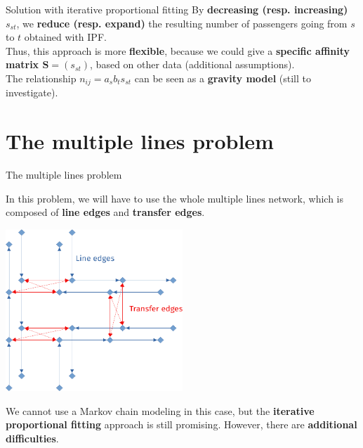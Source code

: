 \documentclass[10pt]{beamer}
\newcommand{\imp}[1]{\textbf{\color{cyan}#1}}
\begin{document}
	
	\begin{frame}{Solution with iterative proportional fitting}
		By \imp{decreasing (resp. increasing) $s_{st}$}, we \imp{reduce (resp. expand)} the resulting number of passengers going from $s$ to $t$ obtained with IPF. \\
		\vspace{0.4cm}
		Thus, this approach is more \imp{flexible}, because we could give a \imp{specific affinity matrix $\mathbf{S} = (s_{st})$}, based on other data (additional assumptions).\\
		\vspace{0.4cm}
		The relationship $n_{ij} = a_s b_t s_{st}$ can be seen as a \imp{gravity model} (still to investigate).
	\end{frame}
		
	
	\section{The multiple lines problem}
	
	
	\begin{frame}{The multiple lines problem}
		
		In this problem, we will have to use the whole multiple lines network, which is composed of \imp{line edges} and \imp{transfer edges}.
		
		\begin{center}
			\includegraphics[width=0.5\textwidth]{img/edge_type2.png}
		\end{center}
	
		We cannot use a Markov chain modeling in this case, but the \imp{iterative proportional fitting} approach is still promising. However, there are \imp{additional difficulties}.
		
	\end{frame}
	
\end{document}
